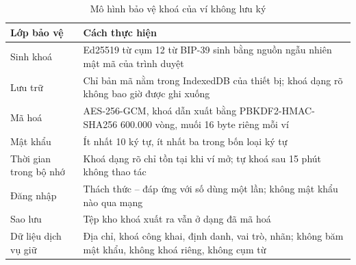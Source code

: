 \begin{table}[H]
\centering
\caption{Mô hình bảo vệ khoá của ví không lưu ký}
\label{tab:v2-wallet}
\renewcommand{\arraystretch}{1.2}
\small
\begin{tabular}{|p{3.2cm}|p{10.2cm}|}
\hline
\textbf{Lớp bảo vệ} & \textbf{Cách thực hiện} \\ \hline
Sinh khoá & Ed25519 từ cụm 12 từ BIP-39 sinh bằng nguồn ngẫu nhiên mật mã của trình duyệt \\ \hline
Lưu trữ & Chỉ bản mã nằm trong IndexedDB của thiết bị; khoá dạng rõ không bao giờ được ghi xuống \\ \hline
Mã hoá & AES-256-GCM, khoá dẫn xuất bằng PBKDF2-HMAC-SHA256 600.000 vòng, muối 16 byte riêng mỗi ví \\ \hline
Mật khẩu & Ít nhất 10 ký tự, ít nhất ba trong bốn loại ký tự \\ \hline
Thời gian trong bộ nhớ & Khoá dạng rõ chỉ tồn tại khi ví mở; tự khoá sau 15 phút không thao tác \\ \hline
Đăng nhập & Thách thức -- đáp ứng với số dùng một lần; không mật khẩu nào qua mạng \\ \hline
Sao lưu & Tệp kho khoá xuất ra vẫn ở dạng đã mã hoá \\ \hline
Dữ liệu dịch vụ giữ & Địa chỉ, khoá công khai, định danh, vai trò, nhãn; không băm mật khẩu, không khoá riêng, không cụm từ \\ \hline
\end{tabular}
\end{table}

